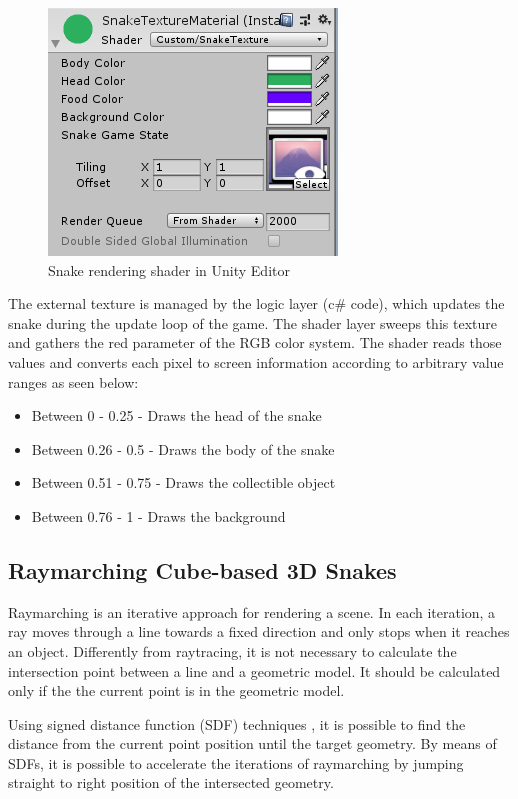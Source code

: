 \documentclass[runningheads]{llncs}
\begin{document}
\begin{figure}[!h]
    \centering
    \includegraphics[scale=1]{src/hci2020-images/SnakeTextureMaterial.png}
    \caption{Snake rendering shader in Unity Editor}
    \label{fig:snake_editor_unity}
\end{figure}

The external texture is managed by the logic layer (c\# code), which updates the snake during the update loop of the game. The shader layer sweeps this texture and gathers the red parameter of the RGB color system. The shader reads those values and converts each pixel to screen information according to arbitrary value ranges as seen below:

\begin{itemize}
  \item Between 0 - 0.25 - Draws the head of the snake
  \item Between 0.26 - 0.5 - Draws the body of the snake
  \item Between 0.51 - 0.75 - Draws the collectible object
  \item Between 0.76 - 1 - Draws the background
\end{itemize}

\subsection{Raymarching Cube-based 3D Snakes}
\label{subsec:raymarching-snakes}
Raymarching is an iterative approach for rendering a scene. In each iteration, a ray moves through a line towards a fixed direction and only stops when it reaches an object. Differently from raytracing, it is not necessary to calculate the intersection point between a line and a geometric model. It should be calculated only if the the current point is in the geometric model.

Using signed distance function (SDF) techniques \cite{hart1996sphere}, it is possible to find the distance from the current point position until the target geometry. By means of SDFs, it is possible to accelerate the iterations of raymarching by jumping straight to right position of the intersected geometry.
\end{document}
